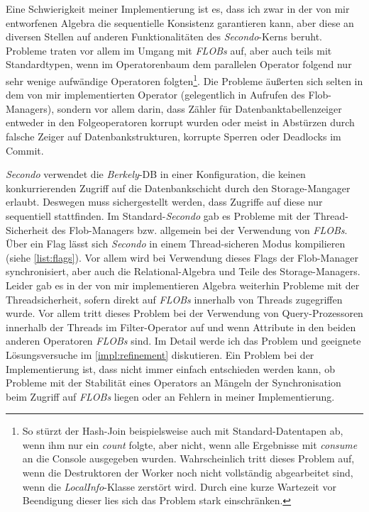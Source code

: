 \documentclass[a4paper,12pt,twoside]{article}
\newcommand{\Fb}[1]{\textit{#1}} %
\begin{document}
Eine Schwierigkeit meiner Implementierung ist es, dass ich zwar in der von mir entworfenen Algebra die sequentielle Konsistenz garantieren kann, aber diese an diversen Stellen auf anderen Funktionalitäten des \Fb{Secondo}-Kerns beruht. Probleme traten vor allem im Umgang mit \Fb{FLOBs} auf, aber auch teils mit Standardtypen, wenn im Operatorenbaum dem parallelen Operator folgend nur sehr wenige aufwändige Operatoren folgten\footnote{So stürzt der Hash-Join beispielsweise auch mit Standard-Datentapen ab, wenn ihm nur ein \Fb{count} folgte, aber nicht, wenn alle Ergebnisse mit \Fb{consume} an die Console ausgegeben wurden. Wahrscheinlich tritt dieses Problem auf, wenn die Destruktoren der Worker noch nicht vollständig abgearbeitet sind, wenn die \Fb{LocalInfo}-Klasse zerstört wird. Durch eine kurze Wartezeit vor Beendigung dieser lies sich das Problem stark einschränken.}. Die Probleme äußerten sich selten in dem von mir implementierten Operator (gelegentlich in Aufrufen des Flob-Managers), sondern vor allem darin, dass Zähler für Datenbanktabellenzeiger entweder in den Folgeoperatoren korrupt wurden oder meist in Abstürzen durch falsche Zeiger auf Datenbankstrukturen, korrupte Sperren oder Deadlocks im Commit. 

\Fb{Secondo} verwendet die \Fb{Berkely}-DB in einer Konfiguration, die keinen konkurrierenden Zugriff auf die Datenbankschicht durch den Storage-Mangager erlaubt. Deswegen muss sichergestellt werden, dass Zugriffe auf diese nur sequentiell stattfinden. Im Standard-\Fb{Secondo} gab es Probleme mit der Thread-Sicherheit des Flob-Managers bzw. allgemein bei der Verwendung von \Fb{FLOBs}. Über ein Flag lässt sich \Fb{Secondo} in einem Thread-sicheren Modus kompilieren (siehe \autoref{list:flags}). Vor allem wird bei Verwendung dieses Flags der Flob-Manager synchronisiert, aber auch die Relational-Algebra und Teile des Storage-Managers. Leider gab es in der von mir implementieren Algebra weiterhin Probleme mit der Threadsicherheit, sofern direkt auf \Fb{FLOBs} innerhalb von Threads zugegriffen wurde. Vor allem tritt dieses Problem bei der Verwendung von Query-Prozessoren innerhalb der Threads im Filter-Operator auf und wenn Attribute in den beiden anderen Operatoren \Fb{FLOBs} sind. Im Detail werde ich das Problem und geeignete Lösungsversuche im \autoref{impl:refinement} diskutieren. Ein Problem bei der Implementierung ist, dass nicht immer einfach entschieden werden kann, ob Probleme mit der Stabilität eines Operators an Mängeln der Synchronisation beim Zugriff auf \Fb{FLOBs} liegen oder an Fehlern in meiner Implementierung.
\end{document}
